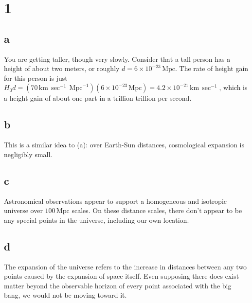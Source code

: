 \documentclass[12pt]{article}
\begin{document}
\newcommand{\mpc}{\mathrm{Mpc}}
\newcommand{\km}{\mathrm{km}}
\newcommand{\solarmass}{M_{\odot}}
\newcommand{\s}{\mathrm{sec}}
\newcommand{\is}{\sec^{-1}}
\newcommand{\ikm}{\km^{-1}}
\newcommand{\impc}{\mpc^{-1}}

\newcommand{\reh}{r_\mathrm{eh}}
\newcommand{\rh}{t_\mathrm{h}}
\newcommand{\el}{\epsilon_\Lambda}

\section*{1}

\subsection*{a}

You are getting taller, though very slowly. Consider that a tall person has a height of about two meters, or roughly \(d = 6 \times 10^{-23} \, \mpc\). The rate of height gain for this person is just \(H_0d = (70 \, \km \, \is \, \impc)(6 \times 10^{-23} \, \mpc) = 4.2 \times 10^{-21} \,\km\,\is\), which is a height gain of about one part in a trillion trillion per second.

\subsection*{b}

This is a similar idea to (a): over Earth-Sun distances, cosmological expansion is negligibly small.

\subsection*{c}

Astronomical observations appear to support a homogeneous and isotropic universe over \(100 \,\mpc\) scales. On these distance scales, there don't appear to be any special points in the universe, including our own location.

\subsection*{d}

The expansion of the universe refers to the increase in distances between any two points caused by the expansion of space itself. Even supposing there does exist matter beyond the observable horizon of every point associated with the big bang, we would not be moving toward it.
\end{document}
